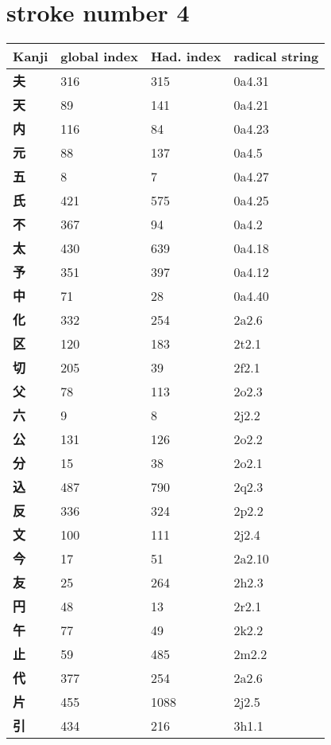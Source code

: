 \section{stroke number 4}
  \begin{longtable}[c]{llll}
    \bfseries Kanji & \bfseries global index & \bfseries Had. index & \bfseries radical string\\\hline\endhead
    \bfseries 夫 & 316 & 315 & 0a4.31\\
    \bfseries 天 & 89 & 141 & 0a4.21\\
    \bfseries 内 & 116 & 84 & 0a4.23\\
    \bfseries 元 & 88 & 137 & 0a4.5\\
    \bfseries 五 & 8 & 7 & 0a4.27\\
    \bfseries 氏 & 421 & 575 & 0a4.25\\
    \bfseries 不 & 367 & 94 & 0a4.2\\
    \bfseries 太 & 430 & 639 & 0a4.18\\
    \bfseries 予 & 351 & 397 & 0a4.12\\
    \bfseries 中 & 71 & 28 & 0a4.40\\
    \bfseries 化 & 332 & 254 & 2a2.6\\
    \bfseries 区 & 120 & 183 & 2t2.1\\
    \bfseries 切 & 205 & 39 & 2f2.1\\
    \bfseries 父 & 78 & 113 & 2o2.3\\
    \bfseries 六 & 9 & 8 & 2j2.2\\
    \bfseries 公 & 131 & 126 & 2o2.2\\
    \bfseries 分 & 15 & 38 & 2o2.1\\
    \bfseries 込 & 487 & 790 & 2q2.3\\
    \bfseries 反 & 336 & 324 & 2p2.2\\
    \bfseries 文 & 100 & 111 & 2j2.4\\
    \bfseries 今 & 17 & 51 & 2a2.10\\
    \bfseries 友 & 25 & 264 & 2h2.3\\
    \bfseries 円 & 48 & 13 & 2r2.1\\
    \bfseries 午 & 77 & 49 & 2k2.2\\
    \bfseries 止 & 59 & 485 & 2m2.2\\
    \bfseries 代 & 377 & 254 & 2a2.6\\
    \bfseries 片 & 455 & 1088 & 2j2.5\\
    \bfseries 引 & 434 & 216 & 3h1.1\\

\end{longtable}

